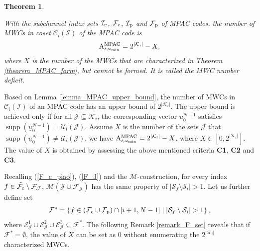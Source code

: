 \documentclass[12pt, draftclsnofoot, peerreview, onecolumn]{IEEEtran}
\makeatletter
\theoremstyle{noparent}
\newtheorem{theorem}{\textbf{Theorem}}
\renewenvironment{proof}[1][\proofname]{\par
  \pushQED{\qed}
  \normalfont \topsep6\p@\@plus6\p@\relax
  \trivlist
  \item[\hskip\labelsep
        \itshape
    #1\@addpunct{:}]\ignorespaces
}{
  \popQED\endtrivlist\@endpefalse
}
\DeclareMathOperator\supp{supp}
\makeatother
\begin{document}
\begin{theorem}
    \label{theorem_MPAC_number}
    
    With the subchannel index sets $\mathcal{I}_{\rm c}$, $\mathcal{F}_{\rm c}$,
    $\mathcal{I}_{\rm p}$ and $\mathcal{F}_{\rm p}$ of MPAC codes,
    the number of MWCs in coset $\mathcal{C}_i(\mathcal{I})$ of the MPAC code is
    \begin{align}
        {\rm A}_{i,\omega_{\min}}^{\rm MPAC} = 2^{|\mathcal{K}_i|} - X,
    \end{align}
    where $X$ is the number of the MWCs that are characterized in Theorem \ref{theorem_MPAC_form},
    but cannot be formed. It is called the MWC number deficit.
\end{theorem}
\begin{proof}[\hspace{1.5em}Proof]
    Based on Lemma \ref{lemma_MPAC_upper_bound},
    the number of MWCs in $\mathcal{C}_i(\mathcal{I})$ of an MPAC code 
    has an upper bound of $2^{|\mathcal{K}_i|}$.
    The upper bound is achieved only if for all $\mathcal{J}\subseteq\mathcal{K}_i$,
    the corresponding vector ${\underline{u}_0^{N-1}}$ satisfies $\supp({\underline{u}_0^{N-1}})=\mathcal{U}_i(\mathcal{J})$.
    Assume $X$ is the number of the sets $\mathcal{J}$ that 
    $\supp({\underline{u}_0^{N-1}})\neq \mathcal{U}_i(\mathcal{J})$, 
    we have ${\rm A}_{i,\omega_{\min}}^{\rm MPAC} = 2^{|\mathcal{K}_i|} - X$,
    where $X\in[0,2^{|\mathcal{K}_i|}]$.
    The value of $X$ is obtained by assessing the above mentioned 
    criteria \textbf{C1}, \textbf{C2} and \textbf{C3}.
\end{proof}

Recalling (\ref{F_c_piao}), (\ref{F_J}) and the $\mathcal{M}$-construction, 
for every index $f \in \tilde{\mathcal{F}_{\rm c}}\setminus\mathcal{F}_{\mathcal{J}}$, 
$\mathcal{M}(\mathcal{J} \cup \mathcal{F}_\mathcal{J})$ has 
the same property of $|\mathcal{S}_f\setminus\mathcal{S}_i|>1$.
Let us further define set 
$$\mathcal{F}^{*}=\left\{f \in (\mathcal{F}_{\rm c}\cup\mathcal{F}_{\rm p}) \cap [i+1,N-1]  \mid  
\left|\mathcal{S}_f \setminus \mathcal{S}_i\right|>1\right\},$$
where $\mathcal{E}_{\mathcal{J}}^{1}\cup\mathcal{E}_{\mathcal{J}}^{2}\cup\mathcal{E}_{\mathcal{J}}^{3}
\subseteq \mathcal{F}^{*}$.
The following Remark \ref{remark_F_set} reveals that 
if $\mathcal{F}^{*}=\emptyset$, the value of $X$ can be set as $0$
without enumerating the $2^{|\mathcal{K}_i|}$ characterized MWCs. 
\end{document}
